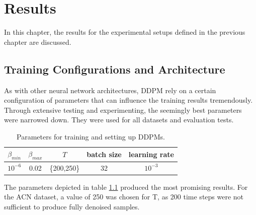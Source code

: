 \chapter{Results}
\label{sec:results}
In this chapter, the results for the experimental setups defined in the previous chapter are discussed.
\section{Training Configurations and Architecture}
\label{sec:training config}
As with other neural network architectures, DDPM rely on a certain configuration of parameters that can influence the training results tremendously.
Through extensive testing and experimenting, the seemingly best parameters were narrowed down. 
They were used for all datasets and evaluation tests. 
\begin{table}[h!]
    \centering
    \begin{tabular}{|c c c c c |} 
         \hline
         $\beta_{min}$ & $\beta_{max}$ & $T$ & batch size & learning rate\\ [0.5ex] 
         \hline\hline
         $10^{-6}$ & 0.02 & \{200,250\} & 32 & $10^{-3}$ \\ 
         \hline
        \end{tabular}
    \caption{Parameters for training and setting up DDPMs.}
    \label{table:params}
\end{table}
The parameters depicted in table \ref{table:params} produced the most promising results. 
For the ACN dataset, a value of 250 was chosen for T, as 200 time steps were not sufficient to produce fully denoised samples.
